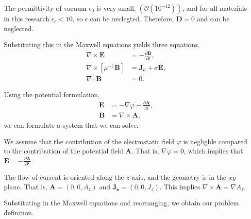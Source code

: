 \begin{assumption}
    The permittivity of vacuum $\epsilon_0$ is very small, $(\mathcal{O}(10^{-12}))$, and for all materials in this research $\epsilon_r < 10$, so $\epsilon$ can be neclegted. Therefore, $\mathbf{D} = 0$ and can be neglected.
\end{assumption}

\noindent Substituting this in the Maxwell equations yields three equations,
\begin{align*}
    \nabla \times \mathbf{E} &= -\frac{\partial \mathbf{B}}{\partial t}, \\
    \nabla \times \left[\mu^{-1}\mathbf{B}\right] &=  \mathbf{J_e} + \sigma \mathbf{E}, \\
    \nabla \cdot \mathbf{B} &= 0.
\end{align*}

\noindent Using the potential formulation,
\begin{align*}
    \mathbf{E} &= -\nabla \varphi -\frac{\partial \mathbf{A}}{\partial t}, \\
    \mathbf{B} &= \nabla \times \mathbf A,
\end{align*}
we can formulate a system that we can solve.

\begin{assumption}
    We assume that the contribution of the electrostatic field $\varphi$ is negligble compared to the contribution of the potential field $\mathbf A$. That is, $\nabla \varphi = 0$, which implies that $\mathbf{E} = -\frac{\partial \mathbf{A}}{\partial t}$.
\end{assumption}

\begin{assumption}
    The flow of current is oriented along the $z$ axis, and the geometry is in the $xy$ plane. That is, $\mathbf{A} = (0, 0, A_z)$ and $\mathbf{J_e} = (0, 0, J_z)$. This implies $\nabla \times \mathbf A = \nabla A_z$.
\end{assumption}

\noindent Substituting in the Maxwell equations and rearranging, we obtain our problem definition.

